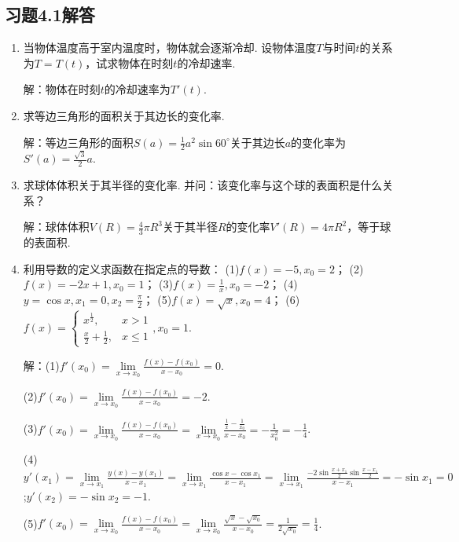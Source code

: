 \documentclass[12pt,UTF8]{ctexart}
\begin{document}
\subsection{习题4.1解答}
\begin{enumerate}
\item 当物体温度高于室内温度时，物体就会逐渐冷却. 设物体温度$T$与时间$t$的关系为$T=T(t)$，试求物体在时刻$t$的冷却速率.

解：物体在时刻$t$的冷却速率为$T'(t)$.

\item 求等边三角形的面积关于其边长的变化率.

解：等边三角形的面积$S(a)=\frac12a^2\sin60^\circ$关于其边长$a$的变化率为$S'(a)=\frac{\sqrt3}2a$.


\item 求球体体积关于其半径的变化率. 并问：该变化率与这个球的表面积是什么关系？

解：球体体积$V(R)=\frac43\pi R^3$关于其半径$R$的变化率$V'(R)=4\pi R^2$，等于球的表面积.

\item 利用导数的定义求函数在指定点的导数：
\newline
(1)$f(x)=-5,x_0=2$；
\newline
(2)$f(x)=-2x+1,x_0=1$；
\newline
(3)$f(x)=\frac1x,x_0=-2$；
\newline
(4)$y=\cos x,x_1=0,x_2=\frac\pi2$；
\newline
(5)$f(x)=\sqrt x,x_0=4$；
\newline
(6)$f(x)=\begin{cases}
x^{\frac12},&x>1\\
\frac x2+\frac12,&x\leq1
\end{cases},x_0=1$.

解：(1)$f'(x_0)=\lim\limits_{x\rightarrow x_0}\frac{f(x)-f(x_0)}{x-x_0}=0$.

(2)$f'(x_0)=\lim\limits_{x\rightarrow x_0}\frac{f(x)-f(x_0)}{x-x_0}=-2$.

(3)$f'(x_0)=\lim\limits_{x\rightarrow x_0}\frac{f(x)-f(x_0)}{x-x_0}=\lim\limits_{x\rightarrow x_0}\frac{\frac1x-\frac1{x_0}}{x-x_0}=-\frac1{x_0^2}=-\frac14$.

(4)$y'(x_1)=\lim\limits_{x\rightarrow x_1}\frac{y(x)-y(x_1)}{x-x_1}=\lim\limits_{x\rightarrow x_1}\frac{\cos x-\cos x_1}{x-x_1}=\lim\limits_{x\rightarrow x_1}\frac{-2\sin{\frac{x+x_1}2}\sin{\frac{x-x_1}2}}{x-x_1}=-\sin x_1=0$;$y'(x_2)=-\sin x_2=-1$.

(5)$f'(x_0)=\lim\limits_{x\rightarrow x_0}\frac{f(x)-f(x_0)}{x-x_0}=\lim\limits_{x\rightarrow x_0}\frac{\sqrt x-\sqrt{x_0}}{x-x_0}=\frac1{2\sqrt{x_0}}=\frac14$.


\end{enumerate}
\end{document}
